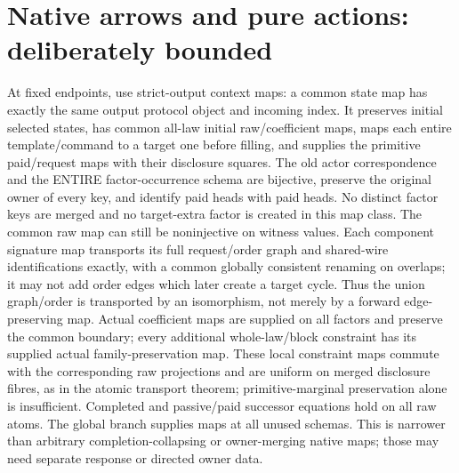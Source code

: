 \documentclass[11pt]{article}\usepackage{amsmath,amssymb,amsthm,geometry}\geometry{margin=1in}
\begin{document}
\section{Native arrows and pure actions: deliberately bounded}
At fixed endpoints, use strict-output context maps: a common state map has exactly the same output protocol object and incoming index. It preserves initial selected states, has common all-law initial raw/coefficient maps, maps each entire template/command to a target one before filling, and supplies the primitive paid/request maps with their disclosure squares. The old actor correspondence and the ENTIRE factor-occurrence schema are bijective, preserve the original owner of every key, and identify paid heads with paid heads. No distinct factor keys are merged and no target-extra factor is created in this map class. The common raw map can still be noninjective on witness values. Each component signature map transports its full request/order graph and shared-wire identifications exactly, with a common globally consistent renaming on overlaps; it may not add order edges which later create a target cycle. Thus the union graph/order is transported by an isomorphism, not merely by a forward edge-preserving map. Actual coefficient maps are supplied on all factors and preserve the common boundary; every additional whole-law/block constraint has its supplied actual family-preservation map. These local constraint maps commute with the corresponding raw projections and are uniform on merged disclosure fibres, as in the atomic transport theorem; primitive-marginal preservation alone is insufficient. Completed and passive/paid successor equations hold on all raw atoms. The global branch supplies maps at all unused schemas. This is narrower than arbitrary completion-collapsing or owner-merging native maps; those may need separate response or directed owner data.
\end{document}
